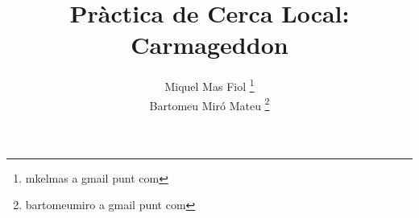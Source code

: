\documentclass[a4paper,11pt]{scrartcl}
\title{Pràctica de Cerca Local: \\ \huge{Carmageddon}}
\author{ Miquel Mas Fiol \thanks{mkelmas a gmail punt com} \\
	 Bartomeu Miró Mateu \thanks{bartomeumiro a gmail punt com} \\}
\begin{document}
  \maketitle

  \begin{abstract}
    
  \end{abstract}

  \newpage
  \setcounter{page}{2}
  \tableofcontents
  \newpage

  
  
  
  
  
  
\end{document}
